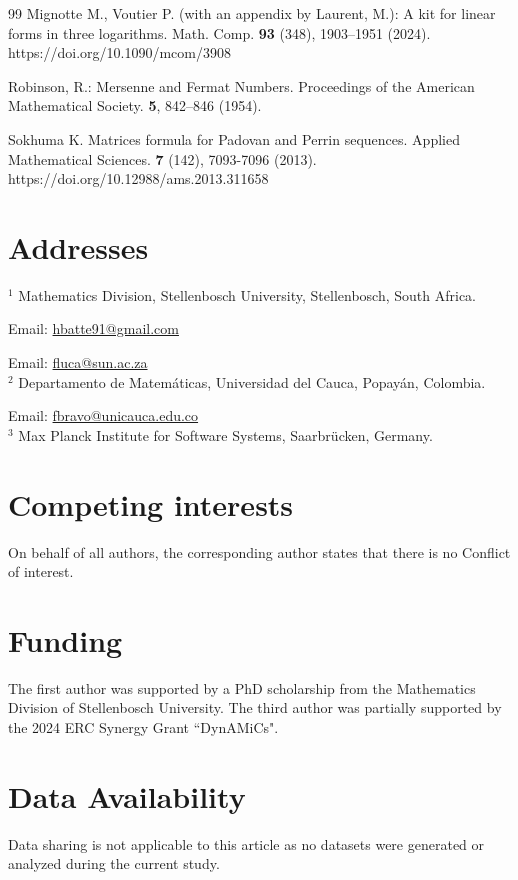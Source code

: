 \documentclass[11pt,a4paper]{article}
\numberwithin{equation}{section}
\numberwithin{table}{section}
\numberwithin{figure}{section}
\begin{document}
\begin{thebibliography}{99}
     Mignotte M., Voutier P. (with an appendix by Laurent, M.): A kit for linear forms in three logarithms. Math. Comp. {\bf 93} (348), 1903--1951 (2024). https://doi.org/10.1090/mcom/3908
    
     Robinson, R.: Mersenne and Fermat Numbers. Proceedings of the American Mathematical Society. {\bf 5}, 842--846 (1954).
    
     Sokhuma K. Matrices formula for Padovan and Perrin sequences. Applied Mathematical Sciences. {\bf 7} (142), 7093-7096 (2013). https://doi.org/10.12988/ams.2013.311658
		
\end{thebibliography}

\section*{Addresses}

$ ^{1} $ Mathematics Division, Stellenbosch University, Stellenbosch, South Africa.

Email: \url{hbatte91@gmail.com}

Email: \url{fluca@sun.ac.za}
\\
$ ^{2} $ Departamento de Matem\'aticas, Universidad del Cauca, Popay\'an, Colombia.

Email: \url{fbravo@unicauca.edu.co}
\\
$ ^{3} $ Max Planck Institute for Software Systems, Saarbr\"ucken, Germany.

\section*{Competing interests}
On behalf of all authors, the corresponding author states that there is no Conflict of interest.

\section*{Funding}
The first author was supported by a PhD scholarship from the Mathematics Division of Stellenbosch University.  The third author was partially supported by the 2024 ERC Synergy Grant ``DynAMiCs". 

\section*{Data Availability}
Data sharing is not applicable to this article as no datasets were generated or analyzed during the current study.
 \newpage
 \appendix
\end{document}
